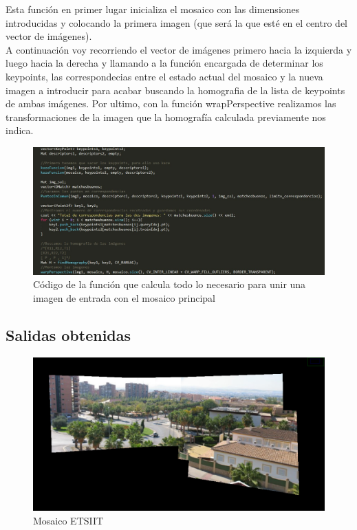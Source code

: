 Esta función en primer lugar inicializa el mosaico con las dimensiones introducidas y colocando la primera imagen (que será la que esté en el centro del vector de imágenes).\\

A continuación voy recorriendo el vector de imágenes primero hacia la izquierda y luego hacia la derecha y llamando a la función encargada de determinar los keypoints, las correspondecias entre el estado actual del mosaico y la nueva imagen a introducir para acabar buscando la homografia de la lista de keypoints de ambas imágenes. Por ultimo, con la función wrapPerspective realizamos las transformaciones de la imagen que la homografía calculada previamente nos indica.

\begin{figure}[H]
	\centering
	\includegraphics[width=0.7\linewidth]{mosaico}
	\caption{Código de la función que calcula todo lo necesario para unir una imagen de entrada con el mosaico principal}
\end{figure}


\subsection{Salidas obtenidas}

\begin{figure}[h]
\centering
\includegraphics[width=1\linewidth]{salidaEj3Etsiit}
\caption{Mosaico ETSIIT}
\label{fig:salidaej3etsiit}
\end{figure}

